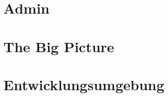 \documentclass{beamer}
\begin{document}
\part{Admin}


\part{The Big Picture}


\part{Entwicklungsumgebung}

\end{document}
